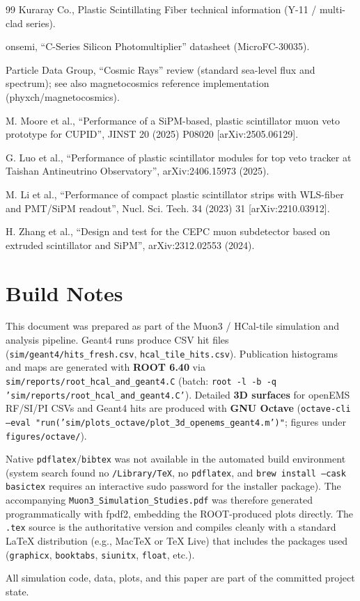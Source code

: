 \documentclass[11pt,a4paper]{article}
\begin{document}
\begin{thebibliography}{99}
Kuraray Co., Plastic Scintillating Fiber technical information (Y-11 / multi-clad series).

onsemi, ``C-Series Silicon Photomultiplier'' datasheet (MicroFC-30035).

Particle Data Group, ``Cosmic Rays'' review (standard sea-level flux and spectrum); see also magnetocosmics reference implementation (phyxch/magnetocosmics).

M. Moore et al., ``Performance of a SiPM-based, plastic scintillator muon veto prototype for CUPID'', JINST 20 (2025) P08020 [arXiv:2505.06129].

G. Luo et al., ``Performance of plastic scintillator modules for top veto tracker at Taishan Antineutrino Observatory'', arXiv:2406.15973 (2025).

M. Li et al., ``Performance of compact plastic scintillator strips with WLS-fiber and PMT/SiPM readout'', Nucl. Sci. Tech. 34 (2023) 31 [arXiv:2210.03912].

H. Zhang et al., ``Design and test for the CEPC muon subdetector based on extruded scintillator and SiPM'', arXiv:2312.02553 (2024).

\end{thebibliography}

\section*{Build Notes}

This document was prepared as part of the Muon3 / HCal-tile simulation and analysis pipeline. Geant4 runs produce CSV hit files (\texttt{sim/geant4/hits\_fresh.csv}, \texttt{hcal\_tile\_hits.csv}). Publication histograms and maps are generated with \textbf{ROOT 6.40} via \texttt{sim/reports/root\_hcal\_and\_geant4.C} (batch: \texttt{root -l -b -q 'sim/reports/root\_hcal\_and\_geant4.C'}). Detailed \textbf{3D surfaces} for openEMS RF/SI/PI CSVs and Geant4 hits are produced with \textbf{GNU Octave} (\texttt{octave-cli --eval "run('sim/plots\_octave/plot\_3d\_openems\_geant4.m')"}; figures under \texttt{figures/octave/}).

Native \texttt{pdflatex}/\texttt{bibtex} was not available in the automated build environment (system search found no \texttt{/Library/TeX}, no \texttt{pdflatex}, and \texttt{brew install --cask basictex} requires an interactive sudo password for the installer package). The accompanying \texttt{Muon3\_Simulation\_Studies.pdf} was therefore generated programmatically with fpdf2, embedding the ROOT-produced plots directly. The \texttt{.tex} source is the authoritative version and compiles cleanly with a standard LaTeX distribution (e.g., MacTeX or TeX Live) that includes the packages used (\texttt{graphicx}, \texttt{booktabs}, \texttt{siunitx}, \texttt{float}, etc.).

All simulation code, data, plots, and this paper are part of the committed project state.
\end{document}
